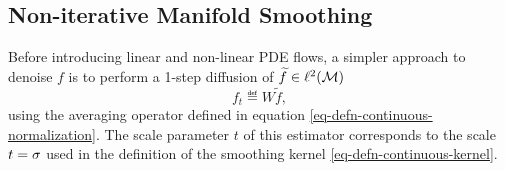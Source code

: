 \documentclass[final]{siamltex}
\newcommand{\manilift}{\phi_f}
\newcommand{\F}{f}
\newcommand{\tF}{\tilde \F}
\begin{document}




\subsection{Non-iterative Manifold Smoothing}
\label{sect-noniterative-smoothing}

Before introducing linear and non-linear PDE flows, a simpler approach to denoise $\F$ is to perform a 1-step diffusion of $\widetilde{f} \in \ell^2(\mathcal{M})$
\begin{equation}
	\label{eq-noniterative-diffusion}
	\F_t \eqdef W \tF,
\end{equation} 
using the averaging operator defined in equation \eqref{eq-defn-continuous-normalization}. The scale parameter $t$ of this estimator corresponds to the scale $t=\sigma$ used in the definition of the smoothing kernel \eqref{eq-defn-continuous-kernel}.
\end{document}
